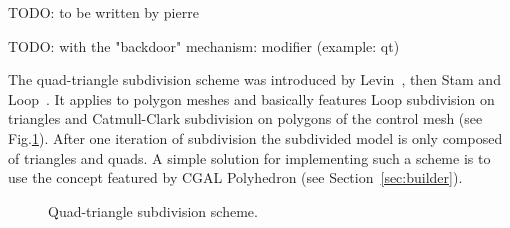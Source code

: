 TODO: to be written by pierre

TODO: with the "backdoor" mechanism: modifier (example: qt) 

The quad-triangle subdivision scheme was introduced by
Levin~\cite{l-pg-03}, then Stam and Loop~\cite{sl-qts-02}. It applies
to polygon meshes and basically features Loop subdivision on triangles
and Catmull-Clark subdivision on polygons of the control mesh (see
Fig.\ref{fig:quad-triangle}). After one iteration of subdivision the
subdivided model is only composed of triangles and quads. A simple
solution for implementing such a scheme is to use the
 concept featured by CGAL 
Polyhedron (see Section~\ref{sec:builder}).

\begin{figure}
    \caption{Quad-triangle subdivision scheme.}
    \label{fig:quad-triangle}
\end{figure}
